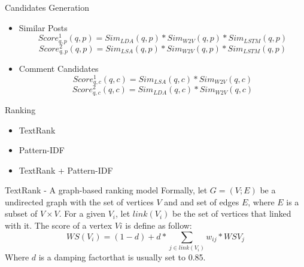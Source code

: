 \documentclass{beamer}
\begin{document}
    \begin{frame}{Candidates Generation}
      \begin{itemize}
      \item Similar Posts
      \begin{equation}
         Score_{q,p}^1(q, p) = Sim_{LDA}(q, p) * Sim_{W2V}(q, p) * Sim_{LSTM}(q, p)
      \end{equation}
      \begin{equation}
         Score_{q,p}^2(q, p) = Sim_{LSA}(q, p) * Sim_{W2V}(q, p) * Sim_{LSTM}(q, p)
      \end{equation}
      \item Comment Candidates
      \begin{equation}
         Score_{q,c}^1(q, c) = Sim_{LSA}(q, c) * Sim_{W2V}(q, c)
      \end{equation}
      \begin{equation}
         Score_{q,c}^2(q, c) = Sim_{LDA}(q, c) * Sim_{W2V}(q, c)
      \end{equation}
    \end{itemize}
    \end{frame}

    \begin{frame}{Ranking}
      \begin{itemize}
        \item TextRank
        \item Pattern-IDF
        \item TextRank + Pattern-IDF
      \end{itemize}
    \end{frame}

    \begin{frame}{TextRank - A graph-based ranking model}
      Formally, let $G = (V; E)$ be a undirected graph with the set of vertices 
      $V$ and and set of edges $E$, where $E$ is a subset of $V \times V$. For 
      a given $V_i$, let $link(V_i)$ be the set of vertices that linked with 
      it. The score of a vertex $Vi$ is define as follow:
      \begin{equation}
        WS(V_i) = (1 - d) + d * \sum_{j \in link(V_i)}{w_{ij} * WS{V_j}}
      \end{equation}
      Where $d$ is a damping factor\footnotemark that is usually set to 0.85.

    \end{frame}
\end{document}
